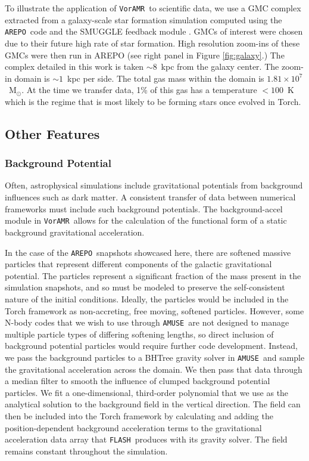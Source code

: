 \documentclass[twoside]{drexel-thesis}
\newcommand\voramr{\texttt{VorAMR}}
\newcommand\flash{\texttt{FLASH}}
\newcommand\amuse{\texttt{AMUSE}}
\newcommand\arepo{\texttt{AREPO}}
\begin{document}
\begin{thesis}
To illustrate the application of \voramr~to scientific data, we use a GMC complex extracted from a galaxy-scale star formation simulation computed using the \arepo~code and the SMUGGLE feedback module \citep{li_effects_2020}. GMCs of interest were chosen due to their future high rate of star formation. High resolution zoom-ins of these GMCs were then run in AREPO (see right panel in Figure \ref{fig:galaxy}.)
The complex detailed in this work is taken $\sim8$~kpc from the galaxy center. The zoom-in domain is $\sim1$~kpc per side. The total gas mass within the domain is $1.81\times10^7$~M$_{\odot}$. At the time we transfer data, 1\% of this gas has a temperature $<100$~K which is the regime that is most likely to be forming stars once evolved in Torch.

\subsection{Other Features}

\subsubsection{Background Potential}
Often, astrophysical simulations include gravitational potentials from background influences such as dark matter. A consistent transfer of data between numerical frameworks must include such background potentials. The background-accel module in \voramr~allows for the calculation of the functional form of a static background gravitational acceleration. 

In the case of the \arepo~snapshots showcased here, there are softened massive particles that represent different components of the galactic gravitational potential. The particles represent a significant fraction of the mass present in the simulation snapshots, and so must be modeled to preserve the self-consistent nature of the initial conditions. Ideally, the particles would be included in the Torch framework as non-accreting, free moving, softened particles. However, some N-body codes that we wish to use through \amuse\ are not designed
to manage multiple particle types of differing softening lengths, so direct inclusion of background potential particles would require further code development.
Instead, we pass the background particles to a BHTree gravity solver \citep{barnes_hierarchical_1986} in \amuse~and sample the gravitational acceleration across the domain. We then pass that data through a median filter to smooth the influence of clumped background potential particles. We fit a one-dimensional, third-order polynomial that we use as the analytical solution to the background field in the vertical direction. The field can then be included into the Torch framework by calculating and adding the position-dependent background acceleration terms to the gravitational acceleration data array that \flash~produces with its gravity solver. The field remains constant throughout the simulation.


\end{thesis}
\end{document}
